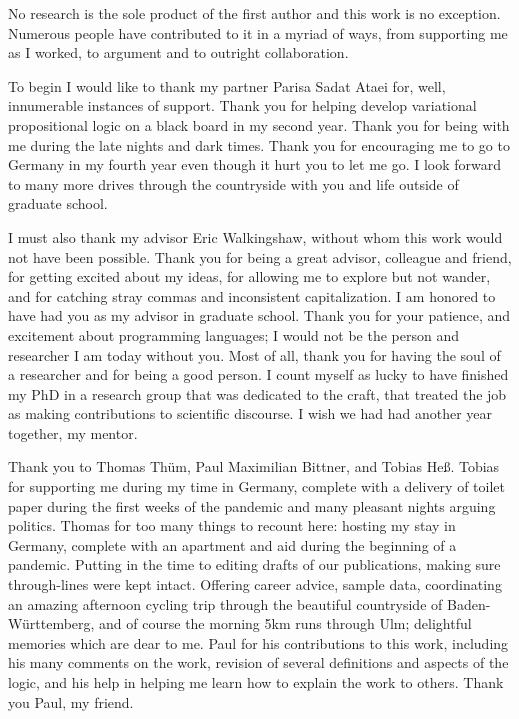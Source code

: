No research is the sole product of the first author and this work is no
exception. Numerous people have contributed to it in a myriad of ways, from
supporting me as I worked, to argument and to outright collaboration.

To begin I would like to thank my partner Parisa Sadat Ataei for, well,
innumerable instances of support. Thank you for helping develop variational
propositional logic on a black board in my second year. Thank you for being with
me during the late nights and dark times. Thank you for encouraging me to go to
Germany in my fourth year even though it hurt you to let me go. I look forward
to many more drives through the countryside with you and life outside of
graduate school.

I must also thank my advisor Eric Walkingshaw, without whom this work would not
have been possible. Thank you for being a great advisor, colleague and friend,
for getting excited about my ideas, for allowing me to explore but not wander,
and for catching stray commas and inconsistent capitalization. I am honored to
have had you as my advisor in graduate school. Thank you for your patience, and
excitement about programming languages; I would not be the person and researcher
I am today without you. Most of all, thank you for having the soul of a
researcher and for being a good person. I count myself as lucky to have finished
my PhD in a research group that was dedicated to the craft, that treated the job
as making contributions to scientific discourse. I wish we had had another year
together, my mentor.

Thank you to Thomas Thüm, Paul Maximilian Bittner, and Tobias Heß. Tobias for
supporting me during my time in Germany, complete with a delivery of toilet
paper during the first weeks of the pandemic and many pleasant nights arguing
politics. Thomas for too many things to recount here: hosting my stay in
Germany, complete with an apartment and aid during the beginning of a pandemic.
Putting in the time to editing drafts of our publications, making sure
through-lines were kept intact. Offering career advice, sample data,
coordinating an amazing afternoon cycling trip through the beautiful countryside
of Baden-Württemberg, and of course the morning 5km runs through Ulm; delightful
memories which are dear to me. Paul for his contributions to this work,
including his many comments on the work, revision of several definitions and
aspects of the logic, and his help in helping me learn how to explain the work
to others. Thank you Paul, my friend.

